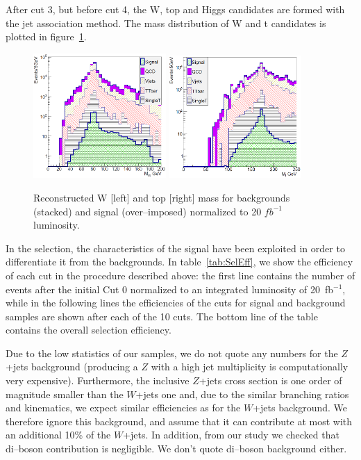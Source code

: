 After cut 3, but before cut 4, the W, top and Higgs candidates are formed with the jet association method. The mass distribution of W and t candidates is plotted in figure~\ref{fig:MWMTop}.

\begin{figure}[!Hhtbp]
  \begin{center}
    \includegraphics[width=0.45\textwidth]{figs/Pheno/MW.png}
    \includegraphics[width=0.45\textwidth]{figs/Pheno/Mtop.png}
    \caption{Reconstructed W [left] and top [right] mass for backgrounds (stacked) and signal (over--imposed) normalized to 20 $fb^{-1}$ luminosity.}
    \label{fig:MWMTop}
  \end{center}
\end{figure}

In the selection, the characteristics of the signal have been exploited in order to differentiate it from the backgrounds. In table~\ref{tab:SelEff}, we show the efficiency of each cut in the procedure described above: the first line contains the number of events after the initial Cut 0 normalized to an integrated luminosity of 20~fb$^{-1}$, while in the following lines the efficiencies of the cuts for signal and background samples are shown after each of the 10 cuts. The bottom line of the table contains the overall selection efficiency. 

Due to the low statistics of our samples, we do not quote any numbers for the $Z$+jets background (producing a $Z$ with a high jet multiplicity is computationally very expensive). Furthermore, the inclusive $Z$+jets cross section is one order of magnitude smaller than the $W$+jets one and, due to the similar branching ratios and kinematics, we expect similar efficiencies as for the $W$+jets background. We therefore ignore this background, and assume that it can contribute at most with an additional 10\% of the $W$+jets. In addition, from our study we checked that di--boson contribution is negligible. We don't quote di--boson background either.

